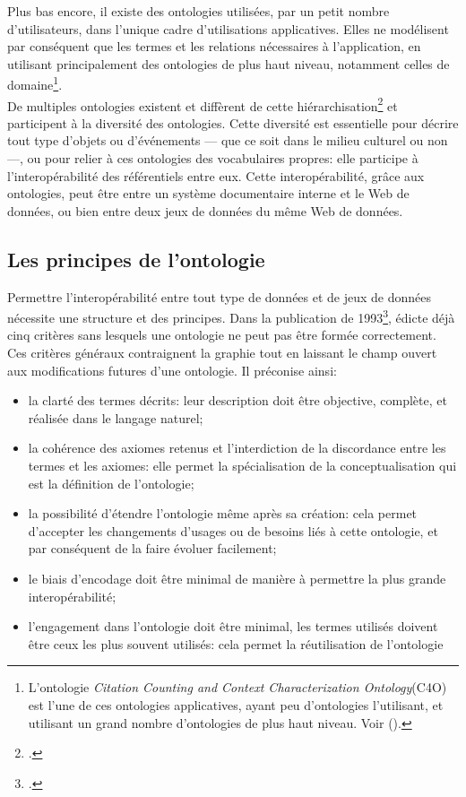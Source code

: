 Plus bas encore, il existe des ontologies utilisées, par un petit nombre d'utilisateurs, dans l'unique cadre d'utilisations applicatives. Elles ne modélisent par conséquent que les termes et les relations nécessaires à l'application, en utilisant principalement des ontologies de plus haut niveau, notamment celles de domaine\footnote{L'ontologie \textit{Citation Counting and Context Characterization Ontology}(C4O) est l'une de ces ontologies applicatives, ayant peu d'ontologies l'utilisant, et utilisant un grand nombre d'ontologies de plus haut niveau. Voir  ().}.\\

De multiples ontologies existent et diffèrent de cette hiérarchisation\footcite[p.2]{isaac_les_2012} et participent à la diversité des ontologies. Cette diversité est essentielle pour décrire tout type d'objets ou d'événements --- que ce soit dans le milieu culturel ou non ---, ou pour relier à ces ontologies des vocabulaires propres: elle participe à l'interopérabilité des référentiels entre eux. Cette interopérabilité, grâce aux ontologies, peut être entre un système documentaire interne et le Web de données, ou bien entre deux jeux de données du même Web de données.

\subsection{\label{II-B-1-c}Les principes de l'ontologie}

Permettre l'interopérabilité entre tout type de données et de jeux de données nécessite une structure et des principes. Dans la publication de 1993\footcite{gruber_toward_1993},  édicte déjà cinq critères sans lesquels une ontologie ne peut pas être formée correctement. Ces critères généraux contraignent la graphie tout en laissant le champ ouvert aux modifications futures d'une ontologie. Il préconise ainsi:
\begin{itemize}
	\item la clarté des termes décrits: leur description doit être objective, complète, et réalisée dans le langage naturel;
	\item la cohérence des axiomes retenus et l'interdiction de la discordance entre les termes et les axiomes: elle permet la spécialisation de la conceptualisation qui est la définition de l'ontologie;
	\item la possibilité d'étendre l'ontologie même après sa création: cela permet d'accepter les changements d'usages ou de besoins liés à cette ontologie, et par conséquent de la faire évoluer facilement;
	\item le biais d'encodage doit être minimal de manière à permettre la plus grande interopérabilité;
	\item l'engagement dans l'ontologie doit être minimal, les termes utilisés doivent être ceux les plus souvent utilisés: cela permet la réutilisation de l'ontologie
\end{itemize}
\bigskip


